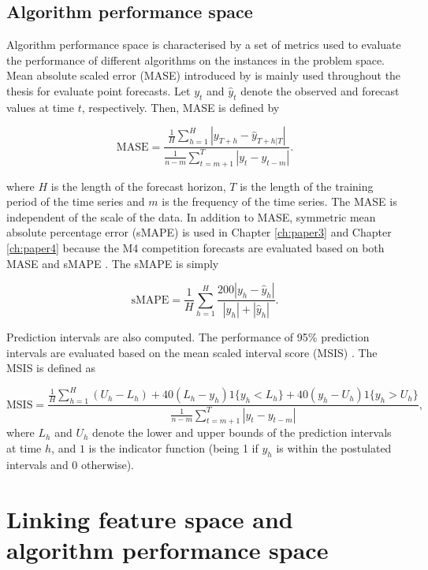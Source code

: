 \documentclass{monashthesis}
\begin{document}
\hypertarget{algorithm-performance-space}{%
\subsection{Algorithm performance space}\label{algorithm-performance-space}}

Algorithm performance space is characterised by a set of metrics used to evaluate the performance of different algorithms on the instances in the problem space. Mean absolute scaled error (MASE) introduced by \textcite{hyndman2006another} is mainly used throughout the thesis for evaluate point forecasts. Let \(y_t\) and \(\hat{y}_t\) denote the observed and forecast values at time \(t\), respectively. Then, MASE is defined by

\[\text{MASE}=\frac{\frac{1}{H}\sum_{h=1}^H |y_{T+h}-\hat{y}_{T+h|T}|}{\frac{1}{n-m}\sum_{t={m+1}}^{T}|y_t - y_{t-m}|}.\]

where \(H\) is the length of the forecast horizon, \(T\) is the length of the training period of the time series and \(m\) is the frequency of the time series. The MASE is independent of the scale of the data. In addition to MASE, symmetric mean absolute percentage error (sMAPE) is used in Chapter \ref{ch:paper3} and Chapter \ref{ch:paper4} because the M4 competition forecasts are evaluated based on both MASE and sMAPE \autocite{M4compguide}. The sMAPE is simply

\[\text{sMAPE}=\frac{1}{H}\sum_{h=1}^H\frac{200|y_h-\hat{y}_h|}{|y_h|+|\hat{y}_h|}.\]

Prediction intervals are also computed. The performance of 95\% prediction intervals are evaluated based on the mean scaled interval score (MSIS) \autocites{gneiting2007strictly}{M4compguide}. The MSIS is defined as

\[\text{MSIS} = \frac{\frac{1}{H}\sum_{h=1}^{H}(U_h-L_h)+40(L_h-y_h)1\{y_h<L_h\}+40(y_h-U_h)1\{y_h>U_h\}}{\frac{1}{n-m}\sum_{t=m+1}^{T}|y_t-y_{t-m}|},\]
where \(L_h\) and \(U_h\) denote the lower and upper bounds of the prediction intervals at time \(h\), and \(1\) is the indicator function (being 1 if \(y_h\) is within the postulated intervals and 0 otherwise).

\hypertarget{linking-feature-space-and-algorithm-performance-space}{%
\section{Linking feature space and algorithm performance space}\label{linking-feature-space-and-algorithm-performance-space}}
\end{document}
